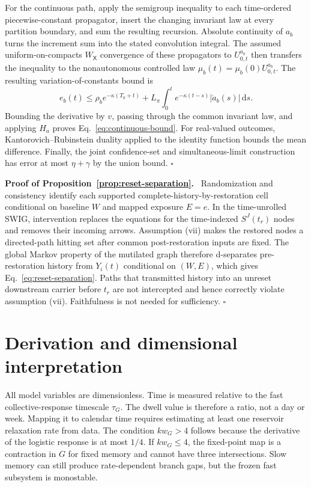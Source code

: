 \documentclass[pdflatex,sn-mathphys-num]{sn-jnl}
\newcommand{\dd}{\mathrm{d}}
\newcommand{\inlinehead}[1]{\par\smallskip\noindent\textbf{#1}\ }
\begin{document}
\begin{appendices}
For the continuous path, apply the semigroup inequality to each time-ordered piecewise-constant propagator, insert the changing invariant law at every partition boundary, and sum the resulting recursion. Absolute continuity of $a_b$ turns the increment sum into the stated convolution integral. The assumed uniform-on-compacts $W_{\mathsf X}$ convergence of these propagators to $U_{0,t}^{a_b}$ then transfers the inequality to the nonautonomous controlled law $\mu_b(t)=\mu_b(0)U_{0,t}^{a_b}$. The resulting variation-of-constants bound is
\begin{equation}
e_b(t)\le \rho_b e^{-\kappa(T_0+t)}
+L_\pi\int_0^t e^{-\kappa(t-s)}|\dot a_b(s)|\,\dd s.
\end{equation}
Bounding the derivative by $v$, passing through the common invariant law, and applying $H_a$ proves Eq.~\eqref{eq:continuous-bound}. For real-valued outcomes, Kantorovich--Rubinstein duality applied to the identity function bounds the mean difference. Finally, the joint confidence-set and simultaneous-limit construction has error at most $\eta+\gamma$ by the union bound. \hfill$\square$

\inlinehead{Proof of Proposition~\ref{prop:reset-separation}.} Randomization and consistency identify each supported complete-history-by-restoration cell conditional on baseline $W$ and mapped exposure $E=e$. In the time-unrolled SWIG, intervention replaces the equations for the time-indexed $S^J(t_r)$ nodes and removes their incoming arrows. Assumption (vii) makes the restored nodes a directed-path hitting set after common post-restoration inputs are fixed. The global Markov property of the mutilated graph therefore d-separates pre-restoration history from $Y_i(t)$ conditional on $(W,E)$, which gives Eq.~\eqref{eq:reset-separation}. Paths that transmitted history into an unreset downstream carrier before $t_r$ are not intercepted and hence correctly violate assumption (vii). Faithfulness is not needed for sufficiency. \hfill$\square$

\section{Derivation and dimensional interpretation}

All model variables are dimensionless. Time is measured relative to the fast collective-response timescale $\tau_G$. The dwell value is therefore a ratio, not a day or week. Mapping it to calendar time requires estimating at least one reservoir relaxation rate from data. The condition $kw_G>4$ follows because the derivative of the logistic response is at most $1/4$. If $kw_G\leq4$, the fixed-point map is a contraction in $G$ for fixed memory and cannot have three intersections. Slow memory can still produce rate-dependent branch gaps, but the frozen fast subsystem is monostable.


\end{appendices}
\end{document}
